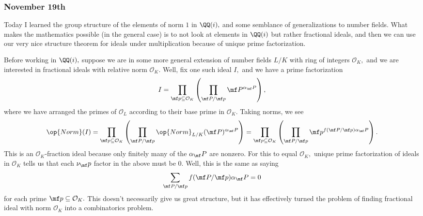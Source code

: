 \subsubsection{November 19th}
Today I learned the group structure of the elements of norm $1$ in $\QQ(i),$ and some semblance of generalizations to number fields. What makes the mathematics possible (in the general case) is to not look at elements in $\QQ(i)$ but rather fractional ideals, and then we can use our very nice structure theorem for ideals under multiplication because of unique prime factorization.

Before working in $\QQ(i),$ suppose we are in some more general extension of number fields $L/K$ with ring of integers $\mathcal O_K,$ and we are interested in fractional ideals with relative norm $\mathcal O_K.$ Well, fix one such ideal $I,$ and we have a prime factorization
\[I=\prod_{\mf p\subseteq\mathcal O_K}\left(\prod_{\mf P/\mf p}\mf P^{\alpha_\mf P}\right),\]
where we have arranged the primes of $\mathcal O_L$ according to their base prime in $\mathcal O_K.$ Taking norms, we see
\[\op{Norm}(I)=\prod_{\mf p\subseteq\mathcal O_K}\left(\prod_{\mf P/\mf p}\op{Norm}_{L/K}(\mf P)^{\alpha_\mf P}\right)=\prod_{\mf p\subseteq\mathcal O_K}\left(\prod_{\mf P/\mf p}\mf p^{f(\mf P/\mf p)\alpha_\mf P}\right).\]
This is an $\mathcal O_K$-fraction ideal because only finitely many of the $\alpha_\mf P$ are nonzero. For this to equal $\mathcal O_K,$ unique prime factorization of ideals in $\mathcal O_K$ tells us that each $\nu_\mf p$ factor in the above must be $0.$ Well, this is the same as saying
\[\sum_{\mf P/\mf p}f(\mf P/\mf p)\alpha_\mf P=0\]
for each prime $\mf p\subseteq\mathcal O_K.$ This doesn't necessarily give us great structure, but it has effectively turned the problem of finding fractional ideal with norm $\mathcal O_K$ into a combinatorics problem.

